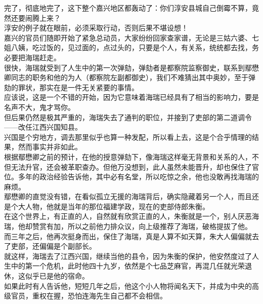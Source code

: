\begin{multicols}{\theparacolNo}
完了，彻底地完了，这下整个嘉兴地区都轰动了：你们淳安县城自己倒霉不算，竟然还要闹腾上来？\\

淳安的例子就在眼前，必须采取行动，否则后果不堪设想！\\

嘉兴的官员们随即开始了紧急总动员，大家纷纷回家查家谱，无论是三姑六婆、七姐八姨，吃过饭的，见过面的，点过头的，只要是个人，有关系，统统都去找，务必要把海瑞赶走。\\

很快，海瑞就受到了人生中的第一次弹劾，弹劾者是都察院监察御史，联系到鄢懋卿同志的职务和他的为人（都察院左副都御史），我们不难猜出其中奥妙，至于弹劾的罪状，那实在是一件无关紧要的事情。\\

应该说，这是一个不错的开始，因为它意味着海瑞已经具有了相当的影响力，要是名声不大，鬼才骂你。\\

但后果仍然是极其严重的，海瑞失去了通判的职位，并接到了吏部的第二道调令——改任江西兴国知县。\\

兴国是个穷地方，调去那里似乎也算一种发配，所以看上去，这是个合乎情理的结果，然而事实并非如此。\\

根据鄢懋卿之前的预计，在他的授意弹劾下，像海瑞这样毫无背景和关系的人，不但无法升官，还会被革职查办。但他万没想到，此人虽然未能晋升，却也保住了官位。多年的政治经验告诉他，其中必有名堂，所以吃惊之余，他也没敢再找海瑞的麻烦。\\

鄢懋卿的直觉没有错，在看似孤立无援的海瑞背后，确实隐藏着另一个人，而且还是个大人物，他就是当年的那位福建学政，现在的吏部侍郎朱衡。\\

在这个世界上，有正直的人，自然就有欣赏正直的人，朱衡就是一个，别人厌恶海瑞，他却赞赏有加，所以之前他力排众议，向上级推荐了海瑞，破格提拔了他。\\

而三年之后，他再次挺身而出，保住了海瑞，真是人算不如天算，朱大人偏偏就去了吏部，还偏偏是个副部长。\\

就这样，海瑞去了江西兴国，继续当他的县令，因为朱衡的保护，他安然度过了人生中的第一个危机，此时他四十九岁，依然是个七品芝麻官，再混几任就光荣退休，这似乎已是他的宿命。\\

如果此时有人告诉他，短短几年之后，他这个小人物将闻名天下，并成为中央的高级官员，重权在握，恐怕连海先生自己都不会相信。\\


\end{multicols}
